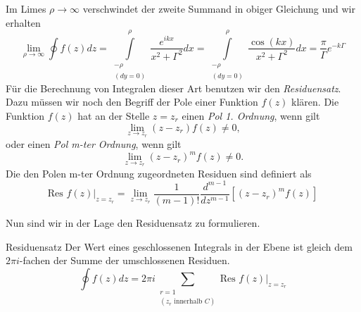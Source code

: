Im Limes $\rho\rightarrow\infty$ verschwindet der zweite Summand in obiger
Gleichung und wir erhalten
\[\lim_{\rho\rightarrow\infty}\oint f(z)dz=
  \int\limits_{\substack{-\rho\\ (dy=0)}}^{\rho}\frac{e^{ikx}}{x^2+\Gamma^2}dx=
\int\limits_{\substack{-\rho\\ (dy=0)}}^{\rho}\frac{\cos(kx)}{x^2+\Gamma^2}dx=\frac{\pi}{\Gamma}e^{-k\Gamma}
\]
Für die Berechnung von Integralen dieser Art benutzen wir den {\it
Residuensatz}. Dazu müssen wir noch den Begriff der Pole einer Funktion $f(z)$
klären. Die Funktion $f(z)$ hat an der Stelle $z=z_r$ einen {\it Pol 1. Ordnung}, wenn gilt
\[\lim_{z\rightarrow z_r}(z-z_r)f(z)\ne 0,\]
oder einen {\it Pol m-ter Ordnung}, wenn gilt
\[\lim_{z\rightarrow z_r}(z-z_r)^mf(z)\ne 0.\]
Die den Polen m-ter Ordnung zugeordneten Residuen sind definiert als
\begin{equation}
  \text{Res }\left.f(z)\right|_{z=z_r}=\lim_{z\rightarrow z_r}\frac{1}{(m-1)!}
    \frac{d^{m-1}}{dz^{m-1}}\left[(z-z_{r})^{m}f(z)\right]
  \label{eq:Residuum}
\end{equation}

Nun sind wir in der Lage den Residuensatz zu formulieren.
\begin{satz}{Residuensatz}
  Der Wert eines geschlossenen Integrals in der Ebene ist gleich dem $2\pi
  i$-fachen der Summe der umschlossenen Residuen.
  \begin{equation}
    \oint f(z)dz=2\pi i\sum\limits_{\substack{r=1\\ (z_r\text{ innerhalb }C)}}\text{Res }\left.f(z)\right|_{z=z_r} 
      \label{eq:Residuensatz}
  \end{equation}
\end{satz}

